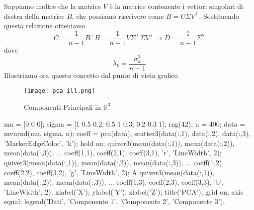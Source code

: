 \documentclass[11pt]{article}
\newcommand{\R}{\mathbb{R}} %
\begin{document}
Sappiamo inoltre che la matrice $V$ è la matrice contenente i vettori singolari di destra della matrice $B$, che possiamo riscrivere come $B = U\Sigma V^\top$. Sostituendo questa relazione otteniamo
$$
C = \frac{1}{n-1} B^\top B = \frac{1}{n-1} V \Sigma^\top \Sigma V^\top \Rightarrow D = \frac{1}{n-1} \Sigma^2
$$
dove $$
\lambda_k = \frac{\sigma_k^2}{n-1}
$$ 
Illustriamo ora questo concetto dal punto di vista grafico 
\begin{figure}[h]
    \centering
    \texttt{[image: pca\_ill.png]}
    \caption{Componenti Principali in $\R^3$}
    \label{fig:pca_ill}
\end{figure}
    
\begin{matlabcode}
mu = [0 0 0]; %
sigma = [1 0.5 0.2; 0.5 1 0.3; 0.2 0.3 1]; %
rng(42); %
n = 400; %
data = mvnrnd(mu, sigma, n); %
coeff = pca(data); %
scatter3(data(:,1), data(:,2), data(:,3), 'MarkerEdgeColor', 'k'); 
hold on;
quiver3(mean(data(:,1)), mean(data(:,2)), mean(data(:,3)), ...
        coeff(1,1), coeff(2,1), coeff(3,1), 'r', 'LineWidth', 2); 
quiver3(mean(data(:,1)), mean(data(:,2)), mean(data(:,3)), ...
        coeff(1,2), coeff(2,2), coeff(3,2), 'g', 'LineWidth', 2); A
quiver3(mean(data(:,1)), mean(data(:,2)), mean(data(:,3)), ...
        coeff(1,3), coeff(2,3), coeff(3,3), 'b', 'LineWidth', 2);
xlabel('X'); ylabel('Y'); zlabel('Z');
title('PCA');
grid on; axis equal;
legend({'Dati', 'Componente 1', 'Componente 2', 'Componente 3'});
\end{matlabcode}
\end{document}
